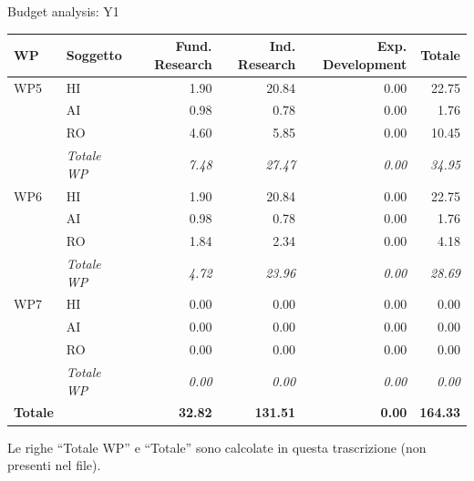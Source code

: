 \documentclass[aspectratio=169,10pt]{beamer}
\begin{document}
\begin{frame}{Budget analysis: Y1}
  
\begin{table}[H]\centering\scriptsize
\begin{tabular}{llrrrr}\toprule\textbf{WP} & \textbf{Soggetto} & \textbf{Fund. Research} & \textbf{Ind. Research} & \textbf{Exp. Development} & \textbf{Totale} \\\midrule
WP5 & HI & 1.90 & 20.84 & 0.00 & 22.75 \\
 & AI & 0.98 & 0.78 & 0.00 & 1.76 \\
 & RO & 4.60 & 5.85 & 0.00 & 10.45 \\
 & \textit{Totale WP} & \textit{7.48} & \textit{27.47} & \textit{0.00} & \textit{34.95} \\\midrule
WP6 & HI & 1.90 & 20.84 & 0.00 & 22.75 \\
 & AI & 0.98 & 0.78 & 0.00 & 1.76 \\
 & RO & 1.84 & 2.34 & 0.00 & 4.18 \\
 & \textit{Totale WP} & \textit{4.72} & \textit{23.96} & \textit{0.00} & \textit{28.69} \\\midrule
WP7 & HI & 0.00 & 0.00 & 0.00 & 0.00 \\
 & AI & 0.00 & 0.00 & 0.00 & 0.00 \\
 & RO & 0.00 & 0.00 & 0.00 & 0.00 \\
 & \textit{Totale WP} & \textit{0.00} & \textit{0.00} & \textit{0.00} & \textit{0.00} \\
\midrule\textbf{Totale} & & \textbf{32.82} & \textbf{131.51} & \textbf{0.00} & \textbf{164.33} \\
\bottomrule\end{tabular}
\par\smallskip\footnotesize Le righe ``Totale WP'' e ``Totale'' sono calcolate in questa trascrizione (non presenti nel file).
\end{table}
\end{frame}
\end{document}
